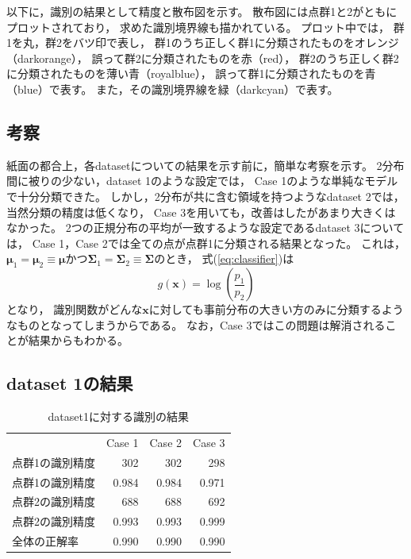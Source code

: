 \documentclass[class=jsarticle, crop=false, dvipdfmx, fleqn]{standalone}
\begin{document}
以下に，識別の結果として精度と散布図を示す。
散布図には点群1と2がともにプロットされており，
求めた識別境界線も描かれている。
プロット中では，
群1を丸，群2をバツ印で表し，
群1のうち正しく群1に分類されたものをオレンジ（darkorange），
誤って群2に分類されたものを赤（red），
群2のうち正しく群2に分類されたものを薄い青（royalblue），
誤って群1に分類されたものを青（blue）で表す。
また，その識別境界線を緑（darkcyan）で表す。



\subsection*{考察}

紙面の都合上，各datasetについての結果を示す前に，簡単な考察を示す。
2分布間に被りの少ない，dataset 1のような設定では，
Case 1のような単純なモデルで十分分類できた。
しかし，2分布が共に含む領域を持つようなdataset 2では，
当然分類の精度は低くなり，
Case 3を用いても，改善はしたがあまり大きくはなかった。
2つの正規分布の平均が一致するような設定であるdataset 3については，
Case 1，Case 2では全ての点が点群1に分類される結果となった。
これは，\(\bm{\mu}_1 = \bm{\mu}_2 \equiv \bm{\mu}\)かつ\(\bm{\Sigma}_1 = \bm{\Sigma}_2 \equiv \bm{\Sigma}\)のとき，
式(\ref{eq:classifier})は
\begin{equation}
    g(\bm{x}) = \log(\frac{p_1}{p_2})
\end{equation}
となり，
識別関数がどんな\(\bm{x}\)に対しても事前分布の大きい方のみに分類するようなものとなってしまうからである。
なお，Case 3ではこの問題は解消されることが結果からもわかる。



\clearpage
\subsection*{dataset 1の結果}

\begin{table}[H]
    \centering
    \caption{dataset1に対する識別の結果}
    \begin{tabular}{lrrr}
            & Case 1 & Case 2 & Case 3 \\
        点群1の識別精度 & 302 & 302 & 298 \\
        点群1の識別精度 & 0.984 & 0.984 & 0.971 \\
        点群2の識別精度 & 688 & 688 & 692 \\
        点群2の識別精度 & 0.993 & 0.993 & 0.999 \\
        全体の正解率 & 0.990 & 0.990 & 0.990
    \end{tabular}
    \label{tab:dataset1_result}
\end{table}
\end{document}
